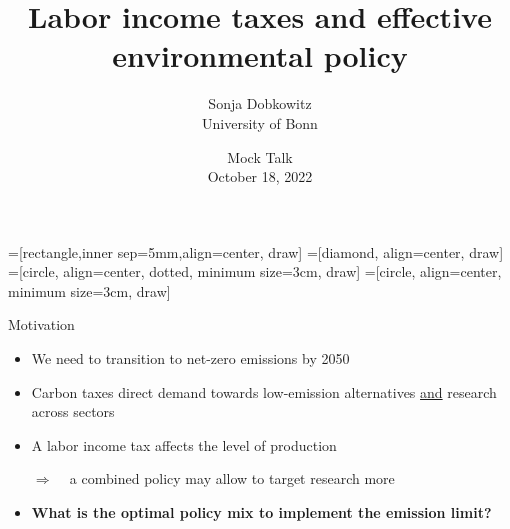 \documentclass[11pt,aspectratio=169]{beamer}
\author[Sonja Dobkowitz]{\small Sonja Dobkowitz\\ \footnotesize{University of Bonn%
	}\\ }
\title{Labor income taxes and effective environmental policy}
\date{\small{Mock Talk\\ October 18, 2022 }}
\newcommand{\ar}{$\Rightarrow$ \ }
\begin{document}
	
	=[rectangle,inner sep=5mm,align=center, draw]
	=[diamond, align=center, draw]
	=[circle, align=center, dotted, minimum size=3cm, draw]
	=[circle, align=center, minimum size=3cm, draw]
	{
		\begin{frame}
		\titlepage
	\end{frame}
}



\addtocounter{framenumber}{-1}
\begin{frame}{Motivation}

\begin{itemize}[<+-| alert@+>]
	\item 	We need to transition to net-zero emissions by 2050 \citep{IPCC2022}
\vspace{3mm}
	\item Carbon taxes direct demand towards low-emission alternatives \underline{and} research across sectors
	\vspace{3mm}
	\item A labor income tax affects the level of production 
	\vspace{3mm}
	\item[\ar] a combined policy may allow to target research more
	\vspace{3mm}
\item \textbf{What is the optimal policy mix to implement the emission limit?}
\end{itemize}
\end{frame}
\end{document}
